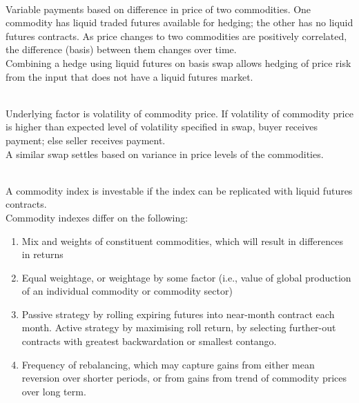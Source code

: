 \begin{remark} \\
Variable payments based on difference in price of two commodities. One commodity has liquid traded futures available for hedging; the other has no liquid futures contracts. As price changes to two commodities are positively correlated, the difference (basis) between them changes over time.\\
Combining a hedge using liquid futures on basis swap allows hedging of price risk from the input that does not have a liquid futures market.
\end{remark}

\begin{remark} \\
Underlying factor is volatility of commodity price. If volatility of commodity price is higher than expected level of volatility specified in swap, buyer receives payment; else seller receives payment.\\
A similar swap settles based on variance in price levels of the commodities.
\end{remark}

\begin{remark} \\
A commodity index is investable if the index can be replicated with liquid futures contracts.\\
Commodity indexes differ on the following:
\begin{enumerate}[label=\roman*.]
\setlength{\itemsep}{0pt}
\item Mix and weights of constituent commodities, which will result in differences in returns
\item Equal weightage, or weightage by some factor (i.e., value of global production of an individual commodity or commodity sector)
\item Passive strategy by rolling expiring futures into near-month contract each month. Active strategy by maximising roll return, by selecting further-out contracts with greatest backwardation or smallest contango.
\item Frequency of rebalancing, which may capture gains from either mean reversion over shorter periods, or from gains from trend of commodity prices over long term.
\end{enumerate}
\end{remark}